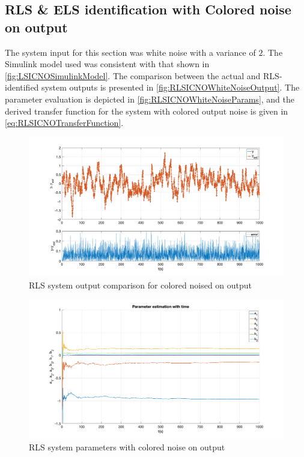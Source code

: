 \FloatBarrier
\subsection{RLS \& ELS identification with Colored noise on output}
The system input for this section was white noise with a variance of $2$. The Simulink model used was consistent with that shown in \autoref{fig:LSICNOSimulinkModel}. The comparison between the actual and RLS-identified system outputs is presented in \autoref{fig:RLSICNOWhiteNoiseOutput}. The parameter evaluation is depicted in \autoref{fig:RLSICNOWhiteNoiseParams}, and the derived transfer function for the system with colored output noise is given in \autoref{eq:RLSICNOTransferFunction}.
  
\begin{figure}
	\centering
	\includegraphics[totalheight=8cm]{images/RLSICNOWhiteNoiseOutput.png}
	\caption{RLS system output comparison for colored noised on output}
	\label{fig:RLSICNOWhiteNoiseOutput}
\end{figure}

\begin{figure}
	\centering
	\includegraphics[totalheight=8cm]{images/RLSICNOWhiteNoiseParams.png}
	\caption{RLS system parameters with colored noise on output}
	\label{fig:RLSICNOWhiteNoiseParams}
\end{figure}

